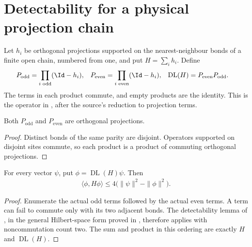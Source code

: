 \section{Detectability for a physical projection chain}

\begin{definition}
    \label{def:physical_detectability}
    \leanok
    Let $h_i$ be orthogonal projections supported on the nearest-neighbour
    bonds of a finite open chain, numbered from one, and put $H=\sum_i h_i$.
    Define
    \begin{align*}
        P_{\mathrm{odd}}     & =\prod_{i\text{ odd}}(\Id-h_i),     &
        P_{\mathrm{even}}    & =\prod_{i\text{ even}}(\Id-h_i),    &
        \operatorname{DL}(H) & =P_{\mathrm{even}}P_{\mathrm{odd}}.
    \end{align*}
    The terms in each product commute, and empty products are the identity.
    This is the operator in \cite[the definition of the one-dimensional
        detectability operator]{Arad2016RigorousRG}, after the source's reduction
    to projection terms.
\end{definition}

\begin{lemma}
    \label{thm:physical_parity_projection}
    \leanok
    Both $P_{\mathrm{odd}}$ and $P_{\mathrm{even}}$ are orthogonal projections.
\end{lemma}
\begin{proof}\leanok
    Distinct bonds of the same parity are disjoint. Operators supported on
    disjoint sites commute, so each product is a product of commuting
    orthogonal projections.
\end{proof}

\begin{lemma}
    \label{thm:physical_detectability_energy}
    \leanok
    For every vector $\psi$, put $\phi=\operatorname{DL}(H)\psi$. Then
    \begin{align*}
        \langle\phi,H\phi\rangle
        \le 4\bigl(\|\psi\|^2-\|\phi\|^2\bigr).
    \end{align*}
\end{lemma}
\begin{proof}\leanok
    Enumerate the actual odd terms followed by the actual even terms.
    A term can fail to commute only with its two adjacent bonds.
    The detectability lemma of \cite{Arad2016RigorousRG}, in the general
    Hilbert-space form proved in \cite{QICLean2026Blueprint}, therefore
    applies with noncommutation count two. The sum and product in this
    ordering are exactly $H$ and $\operatorname{DL}(H)$.
\end{proof}

